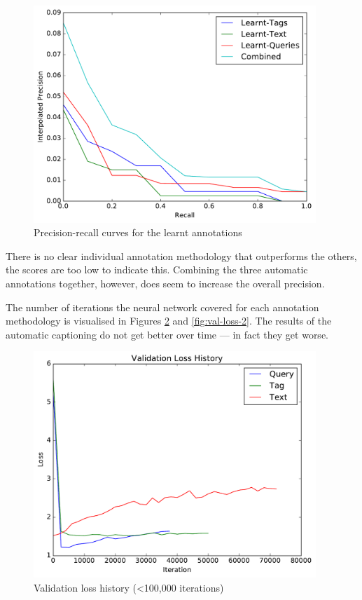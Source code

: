 \begin{figure}[h]
    \centering
    \includegraphics[width=0.95\textwidth]{graphs/learnt-result}
    \caption{Precision-recall curves for the learnt annotations}
    \label{fig:manual-result}
\end{figure}

\FloatBarrier
There is no clear individual annotation methodology that outperforms the others, the scores are too low to indicate this. Combining the three automatic annotations together, however, does seem to increase the overall precision.

The number of iterations the neural network covered for each annotation methodology is visualised in Figures \ref{fig:val-loss-1} and \ref{fig:val-loss-2}. The results of the automatic captioning do not get better over time --- in fact they get worse.

\begin{figure}[h]
    \centering
    \includegraphics[width=0.95\textwidth]{graphs/initial-validation-loss-history}
    \caption{Validation loss history (\textless 100,000 iterations)}
    \label{fig:val-loss-1}
\end{figure}

